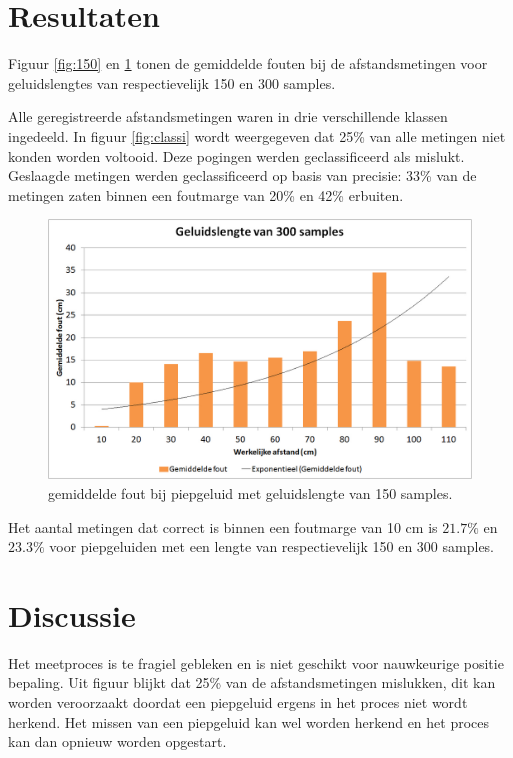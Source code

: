 \documentclass[12pt]{article}
\begin{document}
\section{Resultaten}
\label{sec:resultaten}
Figuur \ref{fig:150} en \ref{fig:300} tonen de gemiddelde fouten bij de afstandsmetingen voor geluidslengtes van respectievelijk 150 en 300 samples.

Alle geregistreerde afstandsmetingen waren in drie verschillende klassen ingedeeld. In figuur \ref{fig:classi} wordt weergegeven dat 25\% van alle metingen niet konden worden voltooid. Deze pogingen werden geclassificeerd als mislukt. Geslaagde metingen werden geclassificeerd op basis van precisie: 33\% van de metingen zaten binnen een foutmarge van 20\% en 42\% erbuiten.

\begin{figure}[t]
\centering
\includegraphics[scale=0.4]{300-samples}
\caption{gemiddelde fout bij piepgeluid met geluidslengte van 150 samples.}
\label{fig:300}
\end{figure}

Het aantal metingen dat correct is binnen een foutmarge van 10 cm is $21.7 \%$ en $23.3\%$ voor piepgeluiden met een lengte van respectievelijk 150 en 300 samples. 

\section{Discussie}
\label{sec:discussie}
Het meetproces is te fragiel gebleken en is niet geschikt voor nauwkeurige positie bepaling. Uit figuur blijkt dat 25\% van de afstandsmetingen mislukken, dit kan worden veroorzaakt doordat een piepgeluid ergens in het proces niet wordt herkend. Het missen van een piepgeluid kan wel worden herkend en het proces kan dan opnieuw worden opgestart. 
\end{document}
